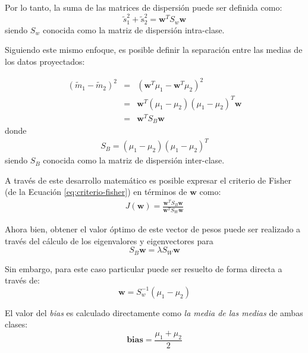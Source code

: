 \documentclass[journal]{IEEEtran}
\begin{document}
Por lo tanto, la suma de las matrices de dispersión puede ser definida como:
\begin{equation}
\tilde{s}_1^2 + \tilde{s}_2^2 = \mathbf{w}^TS_w\mathbf{w}
\end{equation}
siendo $S_w$ conocida como la matriz de dispersión intra-clase.

Siguiendo este mismo enfoque, es posible definir la separación entre las medias de los datos proyectados:

\begin{eqnarray}
(\tilde{m}_1 - \tilde{m}_2)^2 &=&  (\mathbf{w}^T\mu_1 - \mathbf{w}^T\mu_2)^2 \label{eq:medias} \\ 
&=& \mathbf{w}^T(\mu_1 - \mu_2)(\mu_1 - \mu_2)^T\mathbf{w} \\
&=& \mathbf{w}^TS_B\mathbf{w}
\end{eqnarray}
donde 
\begin{eqnarray}
S_B = (\mu_1 - \mu_2)(\mu_1 - \mu_2)^T
\end{eqnarray}
siendo $S_B$ conocida como la matriz de dispersión inter-clase.

A través de este desarrollo matemático es posible expresar el criterio de Fisher (de la Ecuación \ref{eq:criterio-fisher}) en términos de $\mathbf{w}$ como:
\begin{eqnarray}
J(\mathbf{w}) = \frac{\mathbf{w}^T S_B \mathbf{w}}{\mathbf{w}^T S_W \mathbf{w}}
\end{eqnarray}

Ahora bien, obtener el valor óptimo de este vector de pesos puede ser realizado a través del cálculo de los eigenvalores y eigenvectores para
\begin{equation}
S_B\mathbf{w} = \lambda S_W\mathbf{w}
\end{equation}

Sin embargo, para este caso particular puede ser resuelto de forma directa a través de:
\begin{equation}
\mathbf{w} = S_w^{-1}(\mu_1 - \mu_2)
\end{equation}

El valor del \emph{bias} es calculado directamente como \emph{la media de las medias} de ambas clases:
\begin{equation}
\mathbf{bias} = \frac{\mu_1 + \mu_2}{2}
\end{equation}
\end{document}
